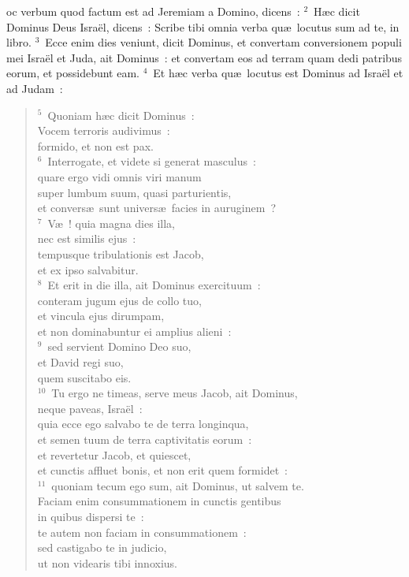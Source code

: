 \bchapter
{}oc verbum quod factum est ad Jeremiam a Domino, dicens~:
${}^{2}$~H\ae c dicit Dominus Deus Isra\"el, dicens~: Scribe tibi omnia verba qu\ae\ locutus sum ad te, in libro.
${}^{3}$~Ecce enim dies veniunt, dicit Dominus, et convertam conversionem populi mei Isra\"el et Juda, ait Dominus~: et convertam eos ad terram quam dedi patribus eorum, et possidebunt eam.
${}^{4}$~Et h\ae c verba qu\ae\ locutus est Dominus ad Isra\"el et ad Judam~:
\begin{verse}${}^{5}$~Quoniam h\ae c dicit Dominus~:\\ Vocem terroris audivimus~:\\ formido, et non est pax.\\
${}^{6}$~Interrogate, et videte si generat masculus~:\\ quare ergo vidi omnis viri manum\\ super lumbum suum, quasi parturientis,\\ et convers\ae\ sunt univers\ae\ facies in auruginem~?\\
${}^{7}$~V\ae~! quia magna dies illa,\\ nec est similis ejus~:\\ tempusque tribulationis est Jacob,\\ et ex ipso salvabitur.\\
${}^{8}$~Et erit in die illa, ait Dominus exercituum~:\\ conteram jugum ejus de collo tuo,\\ et vincula ejus dirumpam,\\ et non dominabuntur ei amplius alieni~:\\
${}^{9}$~sed servient Domino Deo suo,\\ et David regi suo,\\ quem suscitabo eis.\\
${}^{10}$~Tu ergo ne timeas, serve meus Jacob, ait Dominus,\\ neque paveas, Isra\"el~:\\ quia ecce ego salvabo te de terra longinqua,\\ et semen tuum de terra captivitatis eorum~:\\ et revertetur Jacob, et quiescet,\\ et cunctis affluet bonis, et non erit quem formidet~:\\
${}^{11}$~quoniam tecum ego sum, ait Dominus, ut salvem te.\\ Faciam enim consummationem in cunctis gentibus\\ in quibus dispersi te~:\\ te autem non faciam in consummationem~:\\ sed castigabo te in judicio,\\ ut non videaris tibi innoxius.\\

\end{verse}
